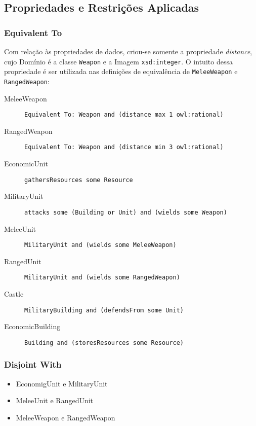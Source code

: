 \documentclass[10pt,a4paper]{article}
\begin{document}

\subsection{Propriedades e Restrições Aplicadas}


\subsubsection{Equivalent To}
Com relação às propriedades de dados, criou-se somente a propriedade \emph{distance}, cujo Domínio é a classe \texttt{Weapon} e a Imagem \texttt{xsd:integer}. O intuito dessa propriedade é ser utilizada nas definições de equivalência de \texttt{MeleeWeapon} e \texttt{RangedWeapon}:
%
\begin{description}
    \item [MeleeWeapon] \texttt{Equivalent To: Weapon and (distance max 1 owl:rational)}
    \item [RangedWeapon] \texttt{Equivalent To: Weapon and (distance min 3 owl:rational)}
    \item [EconomicUnit] \texttt{gathersResources some Resource}
    \item [MilitaryUnit] \texttt{attacks some (Building or Unit) and (wields some Weapon)}
    \item [MeleeUnit] \texttt{MilitaryUnit and (wields some MeleeWeapon)}
    \item [RangedUnit] \texttt{MilitaryUnit and (wields some RangedWeapon)}
    \item [Castle] \texttt{MilitaryBuilding and (defendsFrom some Unit)}
    \item [EconomicBuilding] \texttt{Building and (storesResources some Resource)}
\end{description}

\subsubsection{Disjoint With}
\begin{itemize}
    \item EconomigUnit e MilitaryUnit
    \item MeleeUnit e RangedUnit
    \item MeleeWeapon e RangedWeapon
\end{itemize}
\end{document}
